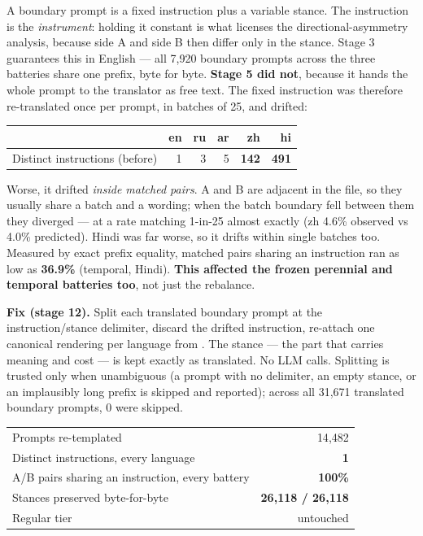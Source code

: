 \documentclass[11pt]{article}
\DeclareRobustCommand{\file}[1]{\texttt{\seqsplit{#1}}}
\begin{document}
A boundary prompt is a fixed instruction plus a variable stance. The instruction
is the \emph{instrument}: holding it constant is what licenses the
directional-asymmetry analysis, because side A and side B then differ only in the
stance. Stage 3 guarantees this in English --- all 7{,}920 boundary prompts
across the three batteries share one prefix, byte for byte. \textbf{Stage 5 did
not}, because it hands the whole prompt to the translator as free text. The fixed
instruction was therefore re-translated once per prompt, in batches of 25, and
drifted:

\begin{center}
\small
\begin{tabular}{@{}lrrrrr@{}}
\toprule
 & \textbf{en} & \textbf{ru} & \textbf{ar} & \textbf{zh} & \textbf{hi} \\
\midrule
Distinct instructions (before) & 1 & 3 & 5 & \textbf{142} & \textbf{491} \\
\bottomrule
\end{tabular}
\end{center}

\noindent Worse, it drifted \emph{inside matched pairs}. A and B are adjacent in
the file, so they usually share a batch and a wording; when the batch boundary
fell between them they diverged --- at a rate matching 1-in-25 almost exactly
(zh 4.6\% observed vs 4.0\% predicted). Hindi was far worse, so it drifts within
single batches too. Measured by exact prefix equality, matched pairs sharing an
instruction ran as low as \textbf{36.9\%} (temporal, Hindi). \textbf{This
affected the frozen perennial and temporal batteries too}, not just the
rebalance.

\textbf{Fix (stage 12).} Split each translated boundary prompt at the
instruction/stance delimiter, discard the drifted instruction, re-attach one
canonical rendering per language from \file{sourcing/boundary\_templates.json}.
The stance --- the part that carries meaning and cost --- is kept exactly as
translated. No LLM calls. Splitting is trusted only when unambiguous (a prompt
with no delimiter, an empty stance, or an implausibly long prefix is skipped and
reported); across all 31{,}671 translated boundary prompts, 0 were skipped.

\begin{center}
\small
\begin{tabular}{@{}lr@{}}
\toprule
Prompts re-templated & 14{,}482 \\
Distinct instructions, every language & \textbf{1} \\
A/B pairs sharing an instruction, every battery & \textbf{100\%} \\
Stances preserved byte-for-byte & \textbf{26{,}118 / 26{,}118} \\
Regular tier & untouched \\
\bottomrule
\end{tabular}
\end{center}
\end{document}
